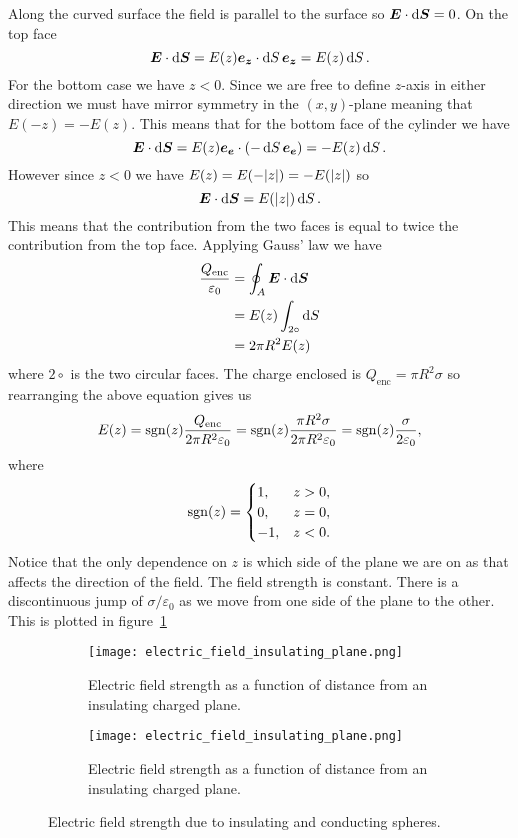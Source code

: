     Along the curved surface the field is parallel to the surface so \(\bm{E}\cdot\dd{\bm{S}} = 0\).
    On the top face
    \[\bm{E}\cdot\dd{\bm{S}} = E(z)\bm{e_{z}}\cdot\dd{S}\bm{e_{z}} = E(z)\dd{S}.\]
    For the bottom case we have \(z < 0\).
    Since we are free to define \(z\)-axis in either direction we must have mirror symmetry in the \((x, y)\)-plane meaning that \(E(-z) = -E(z)\).
    This means that for the bottom face of the cylinder we have
    \[\bm{E}\cdot\dd{\bm{S}} = E(z)\bm{e_{e}}\cdot(-\dd{S}\bm{e_{e}}) = -E(z)\dd{S}.\]
    However since \(z < 0\) we have \(E(z) = E(-\abs{z}) = -E(\abs{z})\) so
    \[\bm{E}\cdot\dd{\bm{S}} = E(\abs{z})\dd{S}.\]
    This means that the contribution from the two faces is equal to twice the contribution from the top face.
    Applying Gauss' law we have
    \begin{align*}
        \frac{Q_\mathrm{enc}}{\varepsilon_0} &= \oint_A\bm{E}\cdot\dd{\bm{S}}\\
        &= E(z)\int_{2\circ}\dd{S}\\
        &= 2\pi R^2E(z)
    \end{align*}
    where \(2\circ\) is the two circular faces.
    The charge enclosed is \(Q_\mathrm{enc} = \pi R^2\sigma\) so rearranging the above equation gives us
    \[E(z) = \operatorname{sgn}(z)\frac{Q_\mathrm{enc}}{2\pi R^2\varepsilon_0} = \operatorname{sgn}(z)\frac{\pi R^2\sigma}{2\pi R^2\varepsilon_0} = \operatorname{sgn}(z)\frac{\sigma}{2\varepsilon_0},\]
    where
    \[
        \operatorname{sgn}(z) = 
        \begin{cases}
            1, & z > 0,\\
            0, & z = 0,\\
            -1, & z < 0.
        \end{cases}
    \]
    Notice that the only dependence on \(z\) is which side of the plane we are on as that affects the direction of the field.
    The field strength is constant.
    There is a discontinuous jump of \(\sigma/\varepsilon_0\) as we move from one side of the plane to the other.
    This is plotted in figure~\ref{fig:electric field insulated plane}
    \begin{figure}[ht]
        \centering
        \begin{subfigure}{0.4\textwidth}
            \centering
            \texttt{[image: electric\_field\_insulating\_plane.png]}
            \caption{Electric field strength as a function of distance from an insulating charged plane.}
            \label{fig:electric field insulated plane}
        \end{subfigure}
        \begin{subfigure}{0.4\textwidth}
            \centering
            \texttt{[image: electric\_field\_insulating\_plane.png]}
            \caption{Electric field strength as a function of distance from an insulating charged plane.}
            \label{fig:electric field conducting plane}
        \end{subfigure}
        \caption{Electric field strength due to insulating and conducting spheres.}
    \end{figure}
